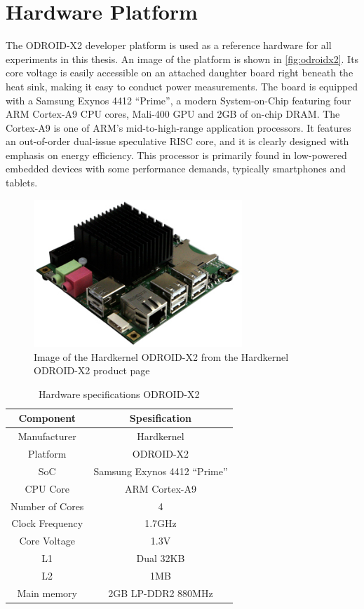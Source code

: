 \section{Hardware Platform}

The ODROID-X2 developer platform \cite{hardkernelodroidx2} is used as a
reference hardware for all experiments in this thesis. An image of the platform
is shown in \autoref{fig:odroidx2}. Its core voltage is easily accessible on an
attached daughter board right beneath the heat sink, making it easy to conduct
power measurements. The board is equipped with a Samsung Exynos 4412 ``Prime'',
a modern System-on-Chip featuring four ARM Cortex-A9 CPU cores, Mali-400 GPU and
2GB of on-chip DRAM. The Cortex-A9 is one of ARM's mid-to-high-range application
processors. It features an out-of-order dual-issue speculative RISC core, and it
is clearly designed with emphasis on energy efficiency. This processor is
primarily found in low-powered embedded devices with some performance demands,
typically smartphones and tablets.

\begin{figure}
    \centering
    \includegraphics[width=0.7\textwidth]{figs/odroid.jpg}
    \caption{Image of the Hardkernel ODROID-X2 from the Hardkernel ODROID-X2 product page \cite{hardkernelodroidx2}}
    \label{fig:odroidx2}
\end{figure}

\begin{table}
    \centering
    \begin{tabular}{|c|c|}
        \hline
        Component      & Spesification\\
        \hline
        Manufacturer   & Hardkernel \\
        Platform       & ODROID-X2 \\
        SoC            & Samsung Exynos 4412 ``Prime'' \\
        CPU Core       & ARM Cortex-A9 \\
        Number of Cores& 4 \\
        Clock Frequency& 1.7GHz \\
        Core Voltage   & 1.3V \\
        L1             & Dual 32KB \\
        L2             & 1MB \\
        Main memory    & 2GB LP-DDR2 880MHz \\
        \hline
    \end{tabular}
    \caption{Hardware specifications ODROID-X2}
    \label{tab:hwspecx2}
\end{table}


